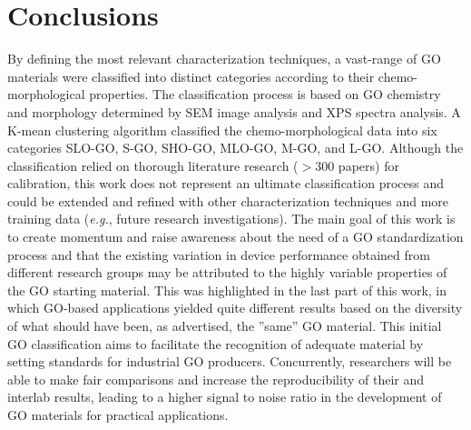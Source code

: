 \section{Conclusions}
By defining the most relevant characterization techniques, a vast-range of GO materials were classified into distinct categories according to their chemo-morphological properties. The classification process is based on GO chemistry and morphology determined by SEM image analysis and XPS spectra analysis. A K-mean clustering algorithm classified the chemo-morphological data into six categories SLO-GO, S-GO, SHO-GO, MLO-GO, M-GO, and L-GO. Although the classification relied on thorough literature research ($>300$ papers) for calibration, this work does not represent an ultimate classification process and could be extended and refined with other characterization techniques and more training data (\textit{e.g.}, future research investigations). The main goal of this work is to create momentum and raise awareness about the need of a GO standardization process and that the existing variation in device performance obtained from different research groups may be attributed to the highly variable properties of the GO starting material. This was highlighted in the last part of this work, in which GO-based applications yielded quite different results based on the diversity of what should have been, as advertised, the ''same'' GO material. This initial GO classification aims to facilitate the recognition of adequate material by setting standards for industrial GO producers. Concurrently, researchers will be able to make fair comparisons and increase the reproducibility of their and interlab results, leading to a higher signal to noise ratio in the development of GO materials for practical applications.





